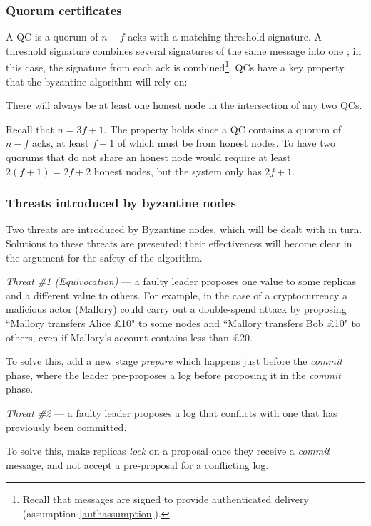 \subsubsection{Quorum certificates}

A QC is a quorum of $n - f$ acks with a matching threshold signature. A threshold signature combines several signatures of the same message into one \cite{shoupPracticalThresholdSignatures2000, cachinRandomOraclesConstantinople2005}; in this case, the signature from each ack is combined\footnote{Recall that messages are signed to provide authenticated delivery (assumption \ref{authassumption}).}. QCs have a key property that the byzantine algorithm will rely on:

\begin{property} \label{qcproperty}
There will always be at least one honest node in the intersection of any two QCs.
\end{property}

Recall that $n = 3f + 1$. The property holds since a QC contains a quorum of $n - f$ acks, at least $f + 1$ of which must be from honest nodes. To have two quorums that do not share an honest node would require at least $2(f + 1) = 2f + 2$ honest nodes, but the system only has $2f + 1$.

\subsubsection{Threats introduced by byzantine nodes}
Two threats are introduced by Byzantine nodes, which will be dealt with in turn. Solutions to these threats are presented; their effectiveness will become clear in the argument for the safety of the algorithm.

\begin{description}
\item \textit{Threat \#1 (Equivocation)} --- a faulty leader proposes one value to some replicas and a different value to others. For example, in the case of a cryptocurrency a malicious actor (Mallory) could carry out a double-spend attack by proposing ``Mallory transfers Alice £10" to some nodes and ``Mallory transfers Bob £10" to others, even if Mallory's account contains less than £20. \label{threat1}

To solve this, add a new stage \textit{prepare} which happens just before the \textit{commit} phase, where the leader pre-proposes a log before proposing it in the \textit{commit} phase.

\item \textit{Threat \#2} --- a faulty leader proposes a log that conflicts with one that has previously been committed. \label{threat2}

To solve this, make replicas \textit{lock} on a proposal once they receive a \textit{commit} message, and not accept a pre-proposal for a conflicting log.
\end{description}

